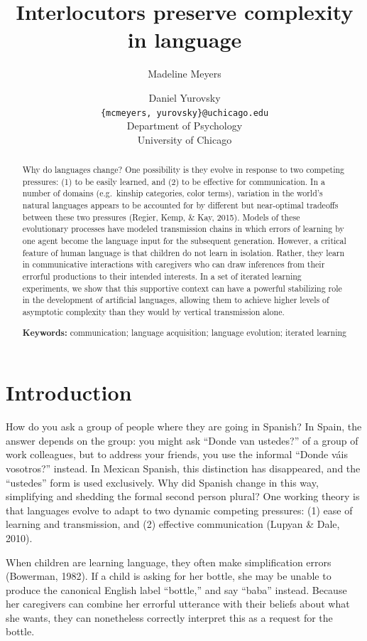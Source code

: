 \documentclass[10pt, letterpaper]{article}
\title{Interlocutors preserve complexity in language}
\author{Madeline Meyers \and Daniel Yurovsky \\
        \texttt{\{mcmeyers, yurovsky\}@uchicago.edu} \\
       Department of Psychology \\ University of Chicago}
\begin{document}
\maketitle

\begin{abstract}
Why do languages change? One possibility is they evolve in response to
two competing pressures: (1) to be easily learned, and (2) to be
effective for communication. In a number of domains (e.g.~kinship
categories, color terms), variation in the world's natural languages
appears to be accounted for by different but near-optimal tradeoffs
between these two pressures (Regier, Kemp, \& Kay, 2015). Models of
these evolutionary processes have modeled transmission chains in which
errors of learning by one agent become the language input for the
subsequent generation. However, a critical feature of human language is
that children do not learn in isolation. Rather, they learn in
communicative interactions with caregivers who can draw inferences from
their errorful productions to their intended interests. In a set of
iterated learning experiments, we show that this supportive context can
have a powerful stabilizing role in the development of artificial
languages, allowing them to achieve higher levels of asymptotic
complexity than they would by vertical transmission alone.

\textbf{Keywords:}
communication; language acquisition; language evolution; iterated
learning
\end{abstract}

\hypertarget{introduction}{%
\section{Introduction}\label{introduction}}

How do you ask a group of people where they are going in Spanish? In
Spain, the answer depends on the group: you might ask ``Donde van
ustedes?'' of a group of work colleagues, but to address your friends,
you use the informal ``Donde váis vosotros?'' instead. In Mexican
Spanish, this distinction has disappeared, and the ``ustedes'' form is
used exclusively. Why did Spanish change in this way, simplifying and
shedding the formal second person plural? One working theory is that
languages evolve to adapt to two dynamic competing pressures: (1) ease
of learning and transmission, and (2) effective communication (Lupyan \&
Dale, 2010).

When children are learning language, they often make simplification
errors (Bowerman, 1982). If a child is asking for her bottle, she may be
unable to produce the canonical English label ``bottle,'' and say
``baba'' instead. Because her caregivers can combine her errorful
utterance with their beliefs about what she wants, they can nonetheless
correctly interpret this as a request for the bottle.
\end{document}
